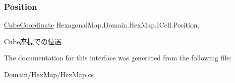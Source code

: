 \subsubsection{\texorpdfstring{Position}{Position}}
{\footnotesize\ttfamily \mbox{\hyperlink{struct_hexagonal_map_1_1_domain_1_1_hex_map_1_1_cube_coordinate}{Cube\+Coordinate}} Hexagonal\+Map.\+Domain.\+Hex\+Map.\+I\+Cell.\+Position\hspace{0.3cm}{\ttfamily [get]}, {\ttfamily [set]}}



Cube座標での位置 



The documentation for this interface was generated from the following file\+:\begin{DoxyCompactItemize}
\item 
Domain/\+Hex\+Map/Hex\+Map.\+cs\end{DoxyCompactItemize}
